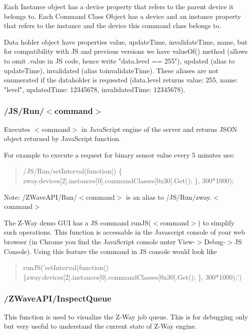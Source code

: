 Each Instance object has a device property that refers to the parent device it belongs to. Each Command Class Object has a device and an instance property that
refers to the instance and the device this command class belongs to.
 
 
Data holder object have properties value, updateTime, invalidateTime, name, but for compatibility with JS and previous versions we have valueOf() method (allows to omit .value in JS code, hence write "data.level == 255"), updated (alias to updateTime), invalidated (alias toinvalidateTime). These aliases are not enumerated if the dataholder is requested (data.level returns {value: 255, name: "level", updatedTime: 12345678, invalidatedTime: 12345678}).



\subsubsection{/JS/Run/$<$command$>$}

Executes $<$command$>$ in JavaScript engine of the server and returns JSON object returned by JavaScript function.

For example to execute a request for binary sensor value every 5 minutes use:

\begin{quote}/JS/Run/setInterval(function() \{ zway.devices[2].instances[0].commandClasses[0x30].Get(); \}, 300*1000);\end{quote}

Note: /ZWaveAPI/Run/$<$command$>$ is an alias to /JS/Run/zway.$<$command$>$

The Z-Way demo GUI has a JS command runJS($<$command$>$) to simplify such operations. This function 
is accessable in the Javascript console of your web browser (in Chrome you find the JavaScript 
console unter View-$>$Debug-$>$JS Console). Using this feature the command in JS console would look like

\begin{quote}runJS('setInterval(function() \{zway.devices[2].instances[0].commandClasses[0x30].Get(); \}, 300*1000);')\end{quote}

\subsubsection{/ZWaveAPI/InspectQueue}

This function is used to visualize the Z-Way job queue. This is for debugging only but very useful to understand the 
current state of Z-Way engine.


